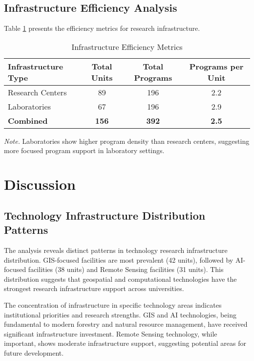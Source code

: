 \documentclass[12pt]{article}
\begin{document}
\subsection{Infrastructure Efficiency Analysis}
Table \ref{tab:infrastructure_efficiency} presents the efficiency metrics for research infrastructure.

\begin{table}[H]
\centering
\caption{Infrastructure Efficiency Metrics}
\label{tab:infrastructure_efficiency}
\begin{tabular}{lccc}
\toprule
\textbf{Infrastructure Type} & \textbf{Total Units} & \textbf{Total Programs} & \textbf{Programs per Unit} \\
\midrule
Research Centers & 89 & 196 & 2.2 \\
Laboratories & 67 & 196 & 2.9 \\
\midrule
\textbf{Combined} & \textbf{156} & \textbf{392} & \textbf{2.5} \\
\bottomrule
\end{tabular}
\small
\textit{Note.} Laboratories show higher program density than research centers, suggesting more focused program support in laboratory settings.
\end{table}

\section{Discussion}

\subsection{Technology Infrastructure Distribution Patterns}
The analysis reveals distinct patterns in technology research infrastructure distribution. GIS-focused facilities are most prevalent (42 units), followed by AI-focused facilities (38 units) and Remote Sensing facilities (31 units). This distribution suggests that geospatial and computational technologies have the strongest research infrastructure support across universities.

The concentration of infrastructure in specific technology areas indicates institutional priorities and research strengths. GIS and AI technologies, being fundamental to modern forestry and natural resource management, have received significant infrastructure investment. Remote Sensing technology, while important, shows moderate infrastructure support, suggesting potential areas for future development.
\end{document}

